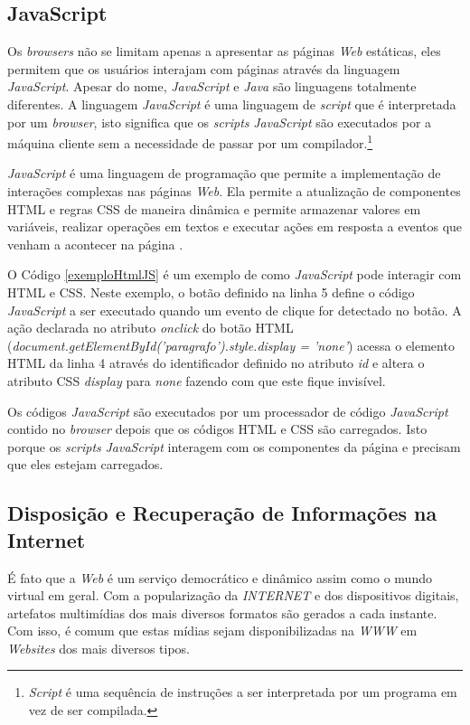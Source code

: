 \subsection{JavaScript} 
Os \emph{browsers} não se limitam apenas a apresentar as páginas \emph{Web} estáticas, eles permitem que os usuários interajam com páginas através da linguagem \emph{JavaScript}. Apesar do nome, \mbox{\emph{JavaScript}} e \emph{Java} são linguagens totalmente diferentes. A linguagem \emph{JavaScript} é uma linguagem de \emph{script} que é interpretada por um \emph{browser}, isto significa que os \emph{scripts} \emph{JavaScript} são executados por a máquina cliente sem a necessidade de passar por um compilador.\footnote{\emph{Script} é uma sequência de instruções a ser interpretada por um programa em vez de ser compilada.}

\emph{JavaScript} é uma linguagem de programação que permite a implementação de interações complexas nas páginas \emph{Web}. Ela permite a atualização de componentes HTML e regras CSS de maneira dinâmica e permite armazenar valores em variáveis, realizar operações em textos e executar ações em resposta a eventos que venham a acontecer na página \cite{mdn}. 

O Código \ref{exemploHtmlJS} é um exemplo de como \emph{JavaScript} pode interagir com HTML e CSS. Neste exemplo, o botão definido na linha 5 define o código \emph{JavaScript} a ser executado quando um evento de clique for detectado no botão. A ação declarada no atributo \emph{onclick} do botão HTML (\emph{document.getElementById('paragrafo').style.display = 'none'}) acessa o elemento HTML da linha 4 através do identificador definido no atributo \emph{id} e altera o atributo CSS \emph{display} para \emph{none} fazendo com que este fique invisível.



Os códigos \emph{JavaScript} são executados por um processador de código \emph{JavaScript} contido no \emph{browser} depois que os códigos HTML e CSS são carregados. Isto porque os \emph{scripts} \emph{JavaScript} interagem com os componentes da página e precisam que eles estejam carregados.
 
\subsection{Disposição e Recuperação de Informações na Internet}
É fato que a \emph{Web} é um serviço democrático e dinâmico assim como o mundo virtual em geral. Com a popularização da \emph{INTERNET} e dos dispositivos digitais, artefatos multimídias dos mais diversos formatos são gerados a cada instante. Com isso, é comum que estas mídias sejam disponibilizadas na \emph{WWW} em \emph{Websites} dos mais diversos tipos.

